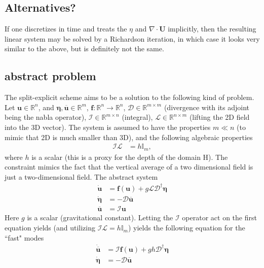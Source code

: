 \documentclass{article}
\begin{document}
\subsection{Alternatives?}
If one discretizes in time and treats the $\eta$ and $\nabla \cdot \bm{U}$ implicitly, then the resulting linear system may be solved by a Richardson iteration, in which case it looks very similar to the above, but is definitely not the same.

\subsection{abstract problem}
The split-explicit scheme aims to be a solution to the following kind of problem. Let $\bm{u} \in \mathbb{R}^n$, and $\bm{\eta}, \overline{\bm{u}} \in \mathbb{R}^m$, $\bm{f}: \mathbb{R}^n \rightarrow \mathbb{R}^n$, $\mathcal{D} \in \mathbb{R}^{m \times m}$ (divergence with its adjoint being the nabla operator), $\mathcal{I} \in \mathbb{R}^{m \times n}$ (integral), $\mathcal{L} \in \mathbb{R}^{n \times m}$ (lifting the 2D field into the 3D vector). The system is assumed to have the properties $m \ll n$ (to mimic that 2D is much smaller than 3D), and the following algebraic properties
\begin{align}
   \mathcal{I} \mathcal{L} &= h \mathbb{I}_m,
\end{align}
where $h$ is a scalar (this is a proxy for the depth of the domain H).
The constraint mimics the fact that the vertical average of a two dimensional field is just a two-dimensional field. The abstract system 
\begin{align}
    \dot{\bm{u}} &= \bm{f}(\bm{u} ) + g \mathcal{L} \mathcal{D}^\dagger \bm{\eta} \\
    \dot{\bm{\eta}} &= - \mathcal{D} \overline{\bm{u}} \\
    \overline{\bm{u}} &= \mathcal{I} \bm{u}
\end{align}
Here $g$ is a scalar (gravitational constant). 
Letting the $\mathcal{I}$ operator act on the first equation yields (and utilizing $\mathcal{I} \mathcal{L} =  h \mathbb{I}_m $) yields the following equation for the ``fast" modes
\begin{align}
    \dot{\overline{\bm{u}}} &= \mathcal{I}\bm{f}(\bm{u} ) + gh \mathcal{D}^\dagger \bm{\eta} \\
    \dot{\bm{\eta}} &= - \mathcal{D} \overline{\bm{u}}
\end{align}
\end{document}
